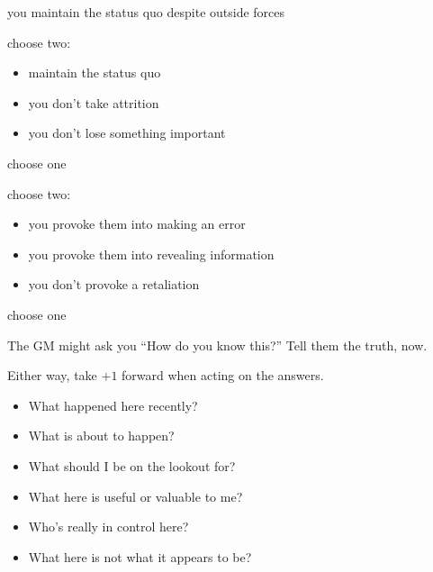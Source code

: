 {you maintain the status quo despite outside forces}
{choose two:
\begin{itemize}
\item maintain the status quo
\item you don't take attrition
\item you don't lose something important
\end{itemize}}
{choose one}

{choose two:
\begin{itemize}
\item you provoke them into making an error
\item you provoke them into revealing information
\item you don't provoke a retaliation
\end{itemize}}
{choose one}


The GM might ask you ``How do you know this?'' Tell them the truth, now.


Either way, take $+1$ forward when acting on the answers.

\begin{itemize}
\item What happened here recently?
\item What is about to happen?
\item What should I be on the lookout for?
\item What here is useful or valuable to me?
\item Who's really in control here?
\item What here is not what it appears to be?
\end{itemize}

